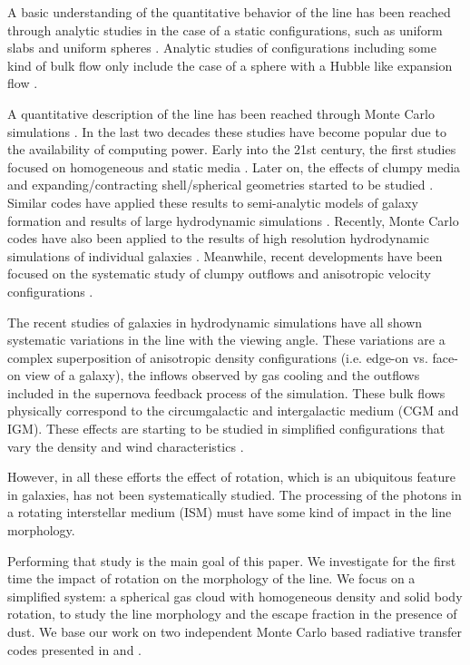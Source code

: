 \documentclass{emulateapj}
\newcommand{\ly}{{\ifmmode{{\rm Ly}\alpha~}\else{Ly$\alpha$~}\fi}}
\begin{document}
A basic understanding of the quantitative behavior of the \ly line
has been reached through analytic studies in the case of a static
configurations, such as uniform slabs
\citep{Adams72,Harrington73,Neufeld90} and uniform spheres
\citep{Dijkstra06}. Analytic studies of configurations including
some kind of bulk flow only include the case of a sphere with a Hubble
like expansion flow \citep{LoebRybicki}. 

A quantitative description of the \ly line has been reached through
Monte Carlo simulations \citep{Auer68,Avery68,Adams72}. In the last
two decades these studies have become popular due to the
availability of computing power. Early into the 21st century, the first
studies focused on homogeneous and static media
\citep{Ahn00,Ahn01,Zheng02}. Later on, the effects of clumpy media
\citep{Hansen06} and expanding/contracting shell/spherical geometries started to
be studied \citep{Verhamme06,Dijkstra06,Ahn2014}. Similar codes have applied
these results to semi-analytic models of galaxy formation \citep{Orsi12, Garel2012} and
results of large hydrodynamic simulations
\citep{CLARA,Forero12,Behrens13}. Recently, Monte Carlo codes have also
been applied to the results of high resolution hydrodynamic
simulations of individual
galaxies \citep{Laursen09,Barnes11,Verhamme12,Yajima12}. Meanwhile, recent
developments have been focused on the systematic study of clumpy
outflows \citep{DijkstraKramer}and anisotropic velocity configurations
\citep{Zheng2013}. 

The recent studies of galaxies in hydrodynamic simulations
\citep{Laursen09,Barnes11,Verhamme12,Yajima12} have all shown
systematic variations in the \ly line with the viewing angle. These
variations are a complex superposition of anisotropic density
configurations (i.e. edge-on vs. face-on view of a galaxy), the
inflows observed by gas cooling and the outflows included in the
supernova feedback process of the simulation. These bulk flows
physically correspond to the circumgalactic and intergalactic medium
(CGM and IGM). These effects are starting to be studied
 in simplified configurations that vary the density and wind
 characteristics \citep{Zheng2013,Behrens2014}. 

However, in all these efforts the effect of rotation,
which is an ubiquitous feature in galaxies, has not been
systematically studied. The processing of the \ly photons in a
rotating interstellar medium (ISM) must have some kind of impact in
the \ly line morphology. 

Performing that study is the main goal of this paper. We investigate for the
first time the impact of rotation on the morphology of the \ly
line. We focus on a simplified system: a spherical gas cloud with
homogeneous density and solid body rotation, to study the line
morphology and the escape fraction in the presence of dust. We base
our work on two independent Monte Carlo based radiative transfer codes
presented in \cite{CLARA} and \cite{DijkstraKramer}.   
  
\end{document}
